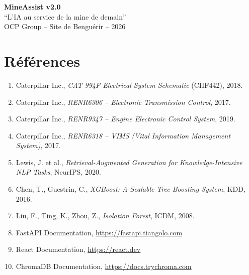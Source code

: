 \documentclass[12pt,a4paper]{report}
\begin{document}
\vspace{2cm}

\begin{center}
\begin{tcolorbox}[colback=ocpLight, colframe=ocpGreen, width=0.7\textwidth, halign=center]
  \textbf{\Large MineAssist v2.0}\\[4pt]
  \textcolor{ocpGold}{``L'IA au service de la mine de demain''}\\[4pt]
  \small OCP Group -- Site de Benguérir -- 2026
\end{tcolorbox}
\end{center}

\chapter*{Références}

\begin{enumerate}
  \item Caterpillar Inc., \textit{CAT 994F Electrical System Schematic} (CHF442), 2018.
  \item Caterpillar Inc., \textit{RENR6306 -- Electronic Transmission Control}, 2017.
  \item Caterpillar Inc., \textit{RENR9347 -- Engine Electronic Control System}, 2019.
  \item Caterpillar Inc., \textit{RENR6318 -- VIMS (Vital Information Management System)}, 2017.
  \item Lewis, J. et al., \textit{Retrieval-Augmented Generation for Knowledge-Intensive NLP Tasks}, NeurIPS, 2020.
  \item Chen, T., Guestrin, C., \textit{XGBoost: A Scalable Tree Boosting System}, KDD, 2016.
  \item Liu, F., Ting, K., Zhou, Z., \textit{Isolation Forest}, ICDM, 2008.
  \item FastAPI Documentation, \url{https://fastapi.tiangolo.com}
  \item React Documentation, \url{https://react.dev}
  \item ChromaDB Documentation, \url{https://docs.trychroma.com}
\end{enumerate}
\end{document}
